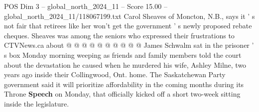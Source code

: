 \begin{textsample}{POS Dim 3 – global\_north\_2024\_11 – Score 15.00 – global\_north\_2024\_11/118067199.txt}
Carol Sheaves of Moncton, N.B., says it ' s not fair that retirees like her won't get the government ' s newly proposed rebate cheques.
Sheaves was among the seniors who expressed their frustrations to CTVNews.ca about @ @ @ @ @ @ @ @ @ @ James Schwalm sat in the prisoner ' s box Monday morning weeping as friends and family members told the court about the devastation he caused when he murdered his wife, Ashley Milne, two years ago inside their Collingwood, Ont. home.
The Saskatchewan Party government said it will prioritize affordability in the coming months during its Throne \textbf{Speech} on Monday, that officially kicked off a short two-week sitting inside the legislature.

\end{textsample}
